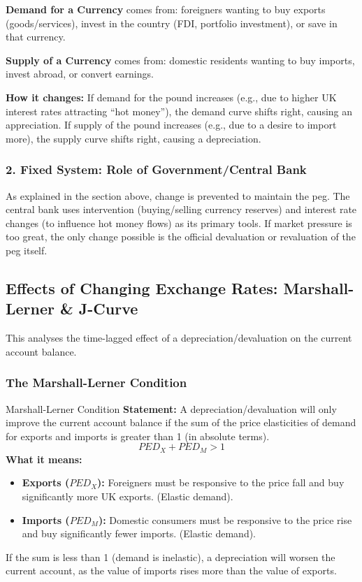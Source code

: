 \documentclass[11pt, a4paper, twoside]{book}
\begin{document}
\textbf{Demand for a Currency} comes from: foreigners wanting to buy exports (goods/services), invest in the country (FDI, portfolio investment), or save in that currency.

\textbf{Supply of a Currency} comes from: domestic residents wanting to buy imports, invest abroad, or convert earnings.

\textbf{How it changes:} If demand for the pound increases (e.g., due to higher UK interest rates attracting ``hot money''), the demand curve shifts right, causing an appreciation. If supply of the pound increases (e.g., due to a desire to import more), the supply curve shifts right, causing a depreciation.

\subsubsection{2. Fixed System: Role of Government/Central Bank}

As explained in the section above, change is prevented to maintain the peg. The central bank uses intervention (buying/selling currency reserves) and interest rate changes (to influence hot money flows) as its primary tools. If market pressure is too great, the only change possible is the official devaluation or revaluation of the peg itself.

\subsection{Effects of Changing Exchange Rates: Marshall-Lerner \& J-Curve}

This analyses the time-lagged effect of a depreciation/devaluation on the current account balance.

\subsubsection{The Marshall-Lerner Condition}

\begin{keyterm}{Marshall-Lerner Condition}
\textbf{Statement:} A depreciation/devaluation will only improve the current account balance if the sum of the price elasticities of demand for exports and imports is greater than 1 (in absolute terms).
\[ PED_X + PED_M > 1 \]
\textbf{What it means:}
\begin{itemize}
  \item \textbf{Exports ($PED_X$):} Foreigners must be responsive to the price fall and buy significantly more UK exports. (Elastic demand).
  \item \textbf{Imports ($PED_M$):} Domestic consumers must be responsive to the price rise and buy significantly fewer imports. (Elastic demand).
\end{itemize}
If the sum is less than 1 (demand is inelastic), a depreciation will worsen the current account, as the value of imports rises more than the value of exports.
\end{keyterm}
\end{document}
